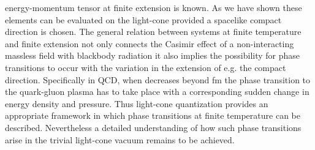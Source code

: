 \documentclass[a4paper,twocolumn,eqsecnum,aps]{revtex4}
\begin{document}
 energy-momentum tensor at finite extension is known. As we have shown these elements can be evaluated on the light-cone provided a spacelike compact direction is chosen. The general relation between systems at finite temperature and finite extension  not only connects the Casimir effect of a non-interacting massless field with blackbody radiation it also implies the possibility for phase transitions to occur with the variation in the extension \coordHE{} of e.g. the compact \coordHE{} direction. Specifically in QCD,  when \coordHE{} decreases beyond \coordHE{}fm the phase transition to the quark-gluon plasma has to take place with a corresponding sudden change in energy density and pressure. Thus light-cone quantization provides an appropriate framework in which phase transitions at finite temperature can be described. Nevertheless  a detailed understanding of  how  such phase transitions arise in the trivial light-cone vacuum remains to be achieved.
\end{document}

